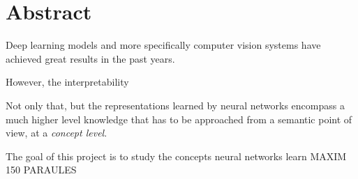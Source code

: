 \chapter*{Abstract}

Deep learning models and more specifically computer vision systems have achieved great results in the past years. 

However, the interpretability 

Not only that, but the representations learned by neural networks encompass a much higher level knowledge that has to be approached from a semantic point of view, at a \emph{concept level}.

The goal of this project is to study the concepts neural networks learn 
MAXIM 150 PARAULES